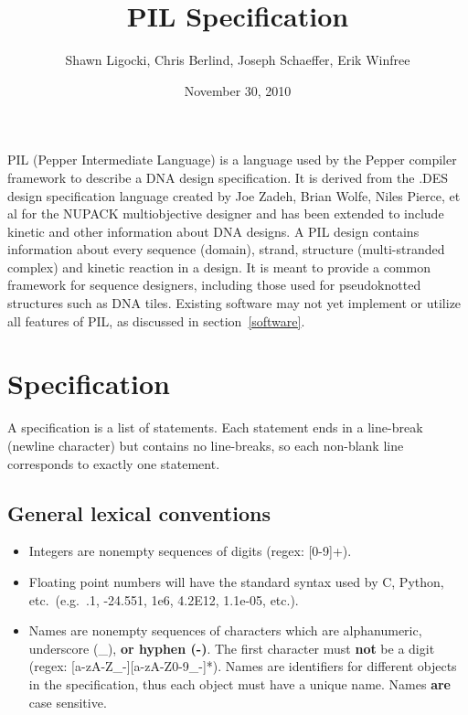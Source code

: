 \documentclass{article}
\begin{document}
\title{PIL Specification}
\author{Shawn Ligocki, Chris Berlind, Joseph Schaeffer, Erik Winfree}
\date{November 30, 2010}
\maketitle

PIL (Pepper Intermediate Language) is a language used by the Pepper
compiler framework to describe a DNA design specification. It is
derived from the .DES design specification language created by Joe
Zadeh, Brian Wolfe, Niles Pierce, et al for the NUPACK multiobjective designer and
has been extended to include kinetic and other information about DNA
designs. A PIL design contains information about every sequence
(domain), strand, structure (multi-stranded complex) and kinetic
reaction in a design.  It is meant to provide a common framework for
sequence designers, including those used for pseudoknotted structures
such as DNA tiles.  Existing software may not yet implement or utilize all features of PIL, as discussed in section~\ref{software}.




\section{Specification}

A specification is a list of statements. Each statement ends in a
line-break (newline character) but contains no line-breaks, so each non-blank line corresponds to exactly one statement.


\subsection{General lexical conventions}
\begin{itemize}
\item Integers are nonempty sequences of digits (regex: [0-9]+).

\item Floating point numbers will have the standard syntax used by C, Python, etc.\ (e.g.\ .1, -24.551, 1e6, 4.2E12, 1.1e-05, etc.).

\item Names are nonempty sequences of characters which are alphanumeric, underscore (\_), \textbf{or hyphen (-)}. The first character must \textbf{not} be a digit (regex: [a-zA-Z\_-][a-zA-Z0-9\_-]*). Names are identifiers for different objects in the specification, thus each object must have a unique name. Names \textbf{are} case sensitive.
\end{itemize}
\end{document}
